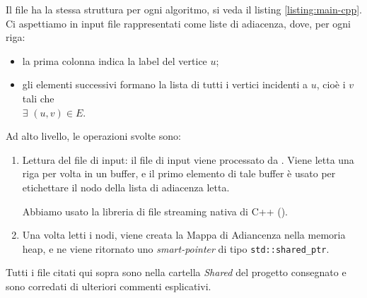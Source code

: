 \noindent Il file  ha la stessa struttura per ogni algoritmo, si veda il listing \ref{listing:main-cpp}.
Ci aspettiamo in input file rappresentati come liste di adiacenza, dove, per ogni riga:

\begin{itemize}
    \item la prima colonna indica la label del vertice $u$;
    \item gli elementi successivi formano la lista di tutti i vertici incidenti a $u$, cioè i $v$ tali che \\ $\exists$ $(u, v) \in E$.
\end{itemize}

Ad alto livello, le operazioni svolte sono:

\begin{enumerate}
    \item Lettura del file di input: il file di input viene processato da . Viene letta una riga per volta in un buffer, e il primo elemento di tale buffer è usato per etichettare il nodo della lista di adiacenza letta.

    \noindent Abbiamo usato la libreria di file streaming nativa di C++ ().

    \item Una volta letti i nodi, viene creata la Mappa di Adiancenza nella memoria heap, e ne viene ritornato uno \textit{smart-pointer} di tipo \texttt{std::shared_ptr}.
\end{enumerate}

\noindent Tutti i file citati qui sopra sono nella cartella \textit{Shared} del progetto consegnato e sono corredati di ulteriori commenti esplicativi.




